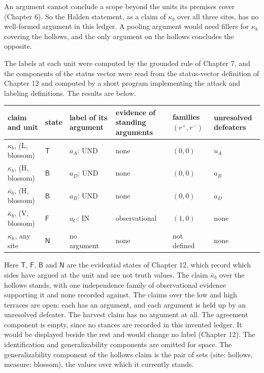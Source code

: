 \documentclass[11pt]{article}
\newcommand{\IN}{\textsf{IN}}
\newcommand{\UND}{\textsf{UND}}
\begin{document}
An argument cannot conclude a scope beyond the units its premises cover (Chapter 6). So the Halden statement, as a claim of $\kappa_b$ over all three sites, has no well-formed argument in this ledger. A pooling argument would need fillers for $\kappa_b$ covering the hollows, and the only argument on the hollows concludes the opposite.

The labels at each unit were computed by the grounded rule of Chapter 7, and the components of the status vector were read from the status-vector definition of Chapter 12 and computed by a short program implementing the attack and labeling definitions. The results are below.

\begin{center}
\small
\begin{tabularx}{\textwidth}{@{}l l l l l X@{}}
\toprule
claim and unit & state & label of its argument & evidence of standing arguments & families $(r^+,r^-)$ & unresolved defeaters\\
\midrule
$\kappa_b$, (L, blossom) & $\mathsf T$ & $a_A$: \UND{} & none & $(0,0)$ & $u_A$\\
$\kappa_b$, (H, blossom) & $\mathsf B$ & $a_D$: \UND{} & none & $(0,0)$ & $a_B$\\
$\bar\kappa_b$, (H, blossom) & $\mathsf B$ & $a_B$: \UND{} & none & $(0,0)$ & $a_D$\\
$\bar\kappa_b$, (V, blossom) & $\mathsf F$ & $a_C$: \IN{} & observational & $(1,0)$ & none\\
$\kappa_h$, any site & $\mathsf N$ & no argument & none & not defined & none\\
\bottomrule
\end{tabularx}
\end{center}

Here $\mathsf T$, $\mathsf F$, $\mathsf B$ and $\mathsf N$ are the evidential states of Chapter 12, which record which sides have argued at the unit and are not truth values. The claim $\bar\kappa_b$ over the hollows stands, with one independence family of observational evidence supporting it and none recorded against. The claims over the low and high terraces are open: each has an argument, and each argument is held up by an unresolved defeater. The harvest claim has no argument at all. The agreement component is empty, since no stances are recorded in this invented ledger. It would be displayed beside the rest and would change no label (Chapter 12). The identification and generalizability components are omitted for space. The generalizability component of the hollows claim is the pair of sets (site: hollows, measure: blossom), the values over which it currently stands.
\end{document}
